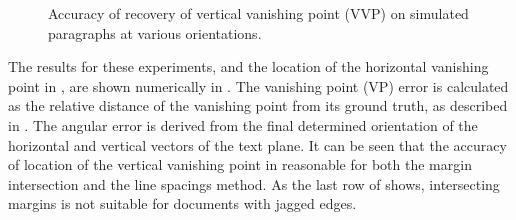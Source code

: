 \begin{figure}[t]
\begin{centering}
  \hspace{2mm}
  \hspace{2mm}
  \hspace{2mm}
\caption{Accuracy of recovery of vertical vanishing point (VVP) on simulated paragraphs at various orientations.}
\label{vvpaccuracy}
\end{centering}
\end{figure}

The results for these experiments, and the location of the horizontal vanishing
point in , are shown numerically in
. 
The vanishing point (VP) error is calculated as the relative distance of the
vanishing point from its ground truth, as described in . 
The angular error is derived from the final determined orientation of the
horizontal and vertical vectors of the text plane. 
It can be seen that the accuracy of location of the vertical vanishing point in
reasonable for both the margin intersection and the line spacings method. 
As the last row of  shows, intersecting margins is not
suitable for documents with jagged edges.

